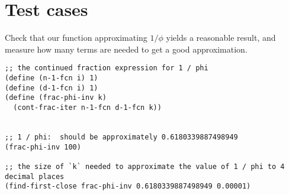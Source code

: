 \documentclass{article}
\begin{document}

\section{Test cases}

Check that our function approximating $1 / \phi$ yields a reasonable result, and
measure how many terms are needed to get a good approximation.

\begin{lstlisting}[style=scheme]
;; the continued fraction expression for 1 / phi
(define (n-1-fcn i) 1)
(define (d-1-fcn i) 1)
(define (frac-phi-inv k)
  (cont-frac-iter n-1-fcn d-1-fcn k))


;; 1 / phi:  should be approximately 0.6180339887498949
(frac-phi-inv 100)

;; the size of `k` needed to approximate the value of 1 / phi to 4 decimal places
(find-first-close frac-phi-inv 0.6180339887498949 0.00001)
\end{lstlisting}
\end{document}
